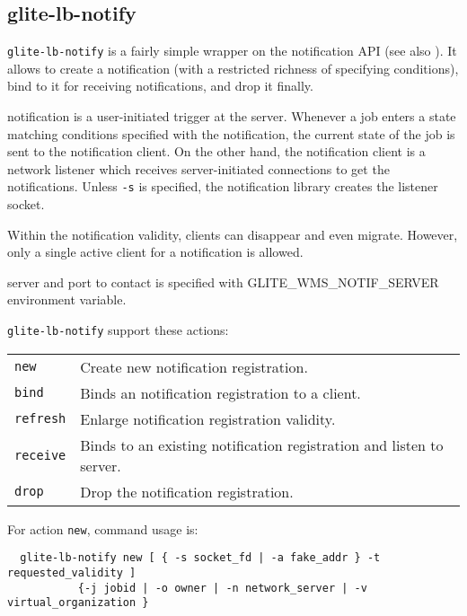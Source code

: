 \subsection{glite-lb-notify}
\label{s:lb-notify}

\verb'glite-lb-notify' is a fairly simple wrapper on the \LB notification API
(see also \cite{lbdg}).
It allows to create a notification (with a restricted richness of specifying 
conditions), bind to it for receiving notifications, and drop it finally.

\LB notification is a user-initiated trigger at the server.
Whenever a job enters a state matching conditions specified with the notification,
the current state of the job is sent to the notification client.
On the other hand, the notification client is a network listener
which receives server-initiated connections to get the notifications.
Unless \verb'-s' is specified, the notification library creates the listener
socket.

Within the notification validity, clients can disappear and even migrate.
However, only a single active client for a notification is allowed.

\LB server and port to contact is specified with GLITE\_WMS\_NOTIF\_SERVER 
environment variable.


\verb'glite-lb-notify' support these actions:

\begin{tabularx}{\textwidth}{lX}
\texttt{new} & Create new notification registration.\\
\texttt{bind} &  Binds an notification registration to a client.\\
\texttt{refresh} &  Enlarge notification registration validity.\\
\texttt{receive}  & Binds to an existing notification registration and listen to
server.\\
\texttt{drop}     & Drop the notification registration.\\
\end{tabularx}

For action \verb'new', command usage is:

\begin{verbatim}
  glite-lb-notify new [ { -s socket_fd | -a fake_addr } -t requested_validity ] 
           {-j jobid | -o owner | -n network_server | -v virtual_organization }
\end{verbatim}

